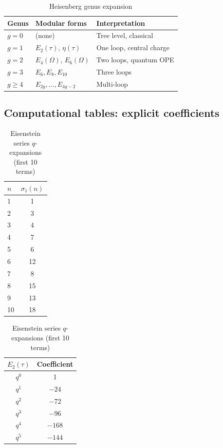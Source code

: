 \begin{table}[ht]
\centering
\caption{Heisenberg genus expansion}
\label{tab:heisenberg-complete-dictionary}
\begin{tabular}{|l|l|l|}
\hline
\textbf{Genus} & \textbf{Modular forms} & \textbf{Interpretation} \\
\hline
$g=0$ & (none) & Tree level, classical \\
\hline
$g=1$ & $E_2(\tau)$, $\eta(\tau)$ & One loop, central charge \\
\hline
$g=2$ & $E_4(\Omega)$, $E_6(\Omega)$ & Two loops, quantum OPE \\
\hline
$g=3$ & $E_6, E_8, E_{10}$ & Three loops \\
\hline
$g \geq 4$ & $E_{2g}, \ldots, E_{4g-2}$ & Multi-loop \\
\hline
\end{tabular}
\end{table}


\subsection{Computational tables: explicit coefficients}
\label{subsec:explicit-coefficients-tables}

\begin{table}[ht]
\centering
\caption{Eisenstein series $q$-expansions (first 10 terms)}
\label{tab:eisenstein-q-expansions}
\begin{tabular}{|l|c|}
\hline
$n$ & $\sigma_1(n)$ \\
\hline
1 & 1 \\
2 & 3 \\
3 & 4 \\
4 & 7 \\
5 & 6 \\
6 & 12 \\
7 & 8 \\
8 & 15 \\
9 & 13 \\
10 & 18 \\
\hline
\end{tabular}
\quad
\begin{tabular}{|c|c|}
\hline
$E_2(\tau)$ & Coefficient \\
\hline
$q^0$ & 1 \\
$q^1$ & $-24$ \\
$q^2$ & $-72$ \\
$q^3$ & $-96$ \\
$q^4$ & $-168$ \\
$q^5$ & $-144$ \\
\hline
\end{tabular}
\end{table}


